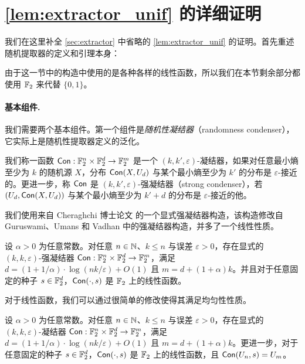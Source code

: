 \section{\cref{lem:extractor_unif} 的详细证明}\label{sec:omitted_proof_extractor}

我们在这里补全 \ref{sec:extractor} 中省略的 \cref{lem:extractor_unif} 的证明。首先重述随机提取器的定义和引理本身：

\Extractor*

\ExtractorUniform*

由于这一节中的构造中使用的是各种各样的线性函数，所以我们在本节剩余部分都使用 $\mathbb{F}_2$ 来代替 $\{0, 1\}$。

\paragraph{基本组件.}

我们需要两个基本组件。第一个组件是\emph{随机性凝结器}（randomness condenser），它实际上是随机性提取器定义的泛化。

\begin{definition}\label{def:condenser}
    我们称一函数 $\mathsf{Con} : \mathbb{F}_2^n \times \mathbb{F}_2^d \to \mathbb{F}_2^m$ 是一个 $(k, k', \varepsilon)$-凝结器，如果对任意最小熵至少为 $k$ 的随机源 $X$，分布 $\mathsf{Con}(X, U_d)$ 与某个最小熵至少为 $k'$ 的分布是 $\varepsilon$-接近的。更进一步，称 $\mathsf{Con}$ 是 $(k, k', \varepsilon)$-强凝结器（strong condenser），若 $(U_d, \mathsf{Con}(X, U_d))$ 与某个最小熵至少为 $k' + d$ 的分布是 $\varepsilon$-接近的他。
\end{definition}

我们使用来自 Cheraghchi 博士论文 \cite{Cheraghchi11_phd_thesis} 的一个显式强凝结器构造，该构造修改自 Guruswami、Umans 和 Vadhan \cite{GUV_extractor} 中的强凝结器构造，并多了一个线性性质。

\begin{lemma}\label{cor:linear_condenser_not_full_rank}
    设 $\alpha>0$ 为任意常数。对任意 $n \in \mathbb{N}$、$k \le n$ 与误差 $\varepsilon > 0$，存在显式的 $(k, k,\varepsilon)$-强凝结器 $\mathsf{Con} : \mathbb{F}_2^n \times \mathbb{F}_2^d \to \mathbb{F}_2^m$，满足 $d = (1 + 1 / \alpha) \cdot \log (n k / \varepsilon) + O(1)$ 且 $m = d + (1 + \alpha)k$。并且对于任意固定的种子 $s \in \mathbb{F}_2^d$，$\mathsf{Con}(\cdot, s)$ 是 $\mathbb{F}_2$ 上的线性函数。
\end{lemma}

对于线性函数，我们可以通过很简单的修改使得其满足均匀性性质。

\begin{corollary}\label{cor:linear_condenser}
    设 $\alpha>0$ 为任意常数。对任意 $n \in \mathbb{N}$、$k \le n$ 与误差 $\varepsilon > 0$，存在显式的 $(k, k,\varepsilon)$-凝结器 $\mathsf{Con} : \mathbb{F}_2^n \times \mathbb{F}_2^d \to \mathbb{F}_2^m$，满足 $d = (1 + 1 / \alpha) \cdot \log (n k / \varepsilon) + O(1)$ 且 $m = d + (1 + \alpha)k$。更进一步，对于任意固定的种子 $s \in \mathbb{F}_2^d$，$\mathsf{Con}(\cdot, s)$ 是 $\mathbb{F}_2$ 上的线性函数，且 $\mathsf{Con}(U_n, s) = U_m$。
\end{corollary}

